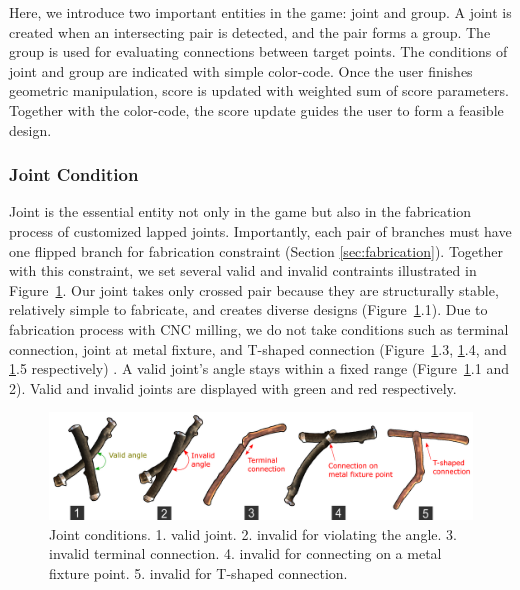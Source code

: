 Here, we introduce two important entities in the game: joint and group.
A joint is created when an intersecting pair is detected, and the pair forms a group.
The group is used for evaluating connections between target points.
The conditions of joint and group are indicated with simple color-code.
Once the user finishes geometric manipulation, score is updated with weighted sum of score parameters.
Together with the color-code, the score update guides the user to form a feasible design.



\subsubsection{Joint Condition}
\label{sec:joint}
Joint is the essential entity not only in the game but also in the fabrication process of customized lapped joints.
Importantly, each pair of branches must have one flipped branch for fabrication constraint (Section \ref{sec:fabrication}).
Together with this constraint, we set several valid and invalid contraints illustrated in Figure~\ref{fig:joint_condition}.
Our joint takes only crossed pair because they are structurally stable, relatively simple to fabricate, and creates diverse designs (Figure~\ref{fig:joint_condition}.1).
Due to fabrication process with CNC milling, we do not take conditions such as terminal connection, joint at metal fixture, and T-shaped connection (Figure~\ref{fig:joint_condition}.3, \ref{fig:joint_condition}.4, and \ref{fig:joint_condition}.5 respectively) .
A valid joint's angle stays within a fixed range (Figure~\ref{fig:joint_condition}.1 and 2).
Valid and invalid joints are displayed with green and red respectively.

\begin{figure}[ht]
	\begin{center}
		\includegraphics[width = 0.4\paperwidth]{images/system/joint_conditions_3.png}
		\caption{Joint conditions. 1. valid joint. 2. invalid for violating the angle. 3. invalid terminal connection. 4. invalid for connecting on a metal fixture point. 5. invalid for T-shaped connection.}
		\label{fig:joint_condition}
	\end{center}
\end{figure}




